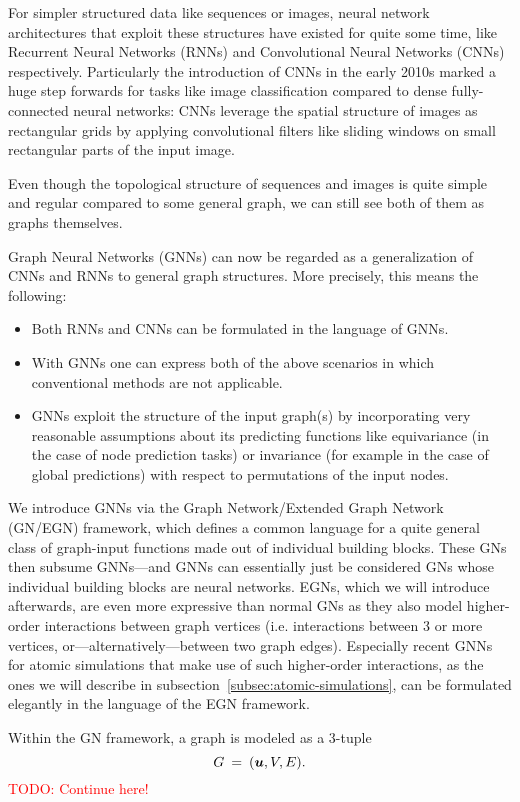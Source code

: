 For simpler structured data like sequences or images, neural
network architectures that exploit these structures have existed for quite some time, like 
Recurrent Neural Networks (RNNs) and
Convolutional Neural Networks (CNNs) respectively. Particularly the introduction of CNNs 
in the early 2010s marked a huge step forwards for tasks like image classification 
compared to dense fully-connected neural networks: CNNs leverage the spatial structure of
images as rectangular grids by applying convolutional filters like sliding windows on small
rectangular parts of the input image. 

Even though the topological structure of sequences and images is quite simple and regular
compared to some general graph, we can still see both of them as graphs themselves. 



Graph Neural 
Networks (GNNs) can now be regarded as a generalization of CNNs and RNNs to general graph structures.
More precisely, this means the following:

\begin{itemize}
    \item Both RNNs and CNNs can be formulated in the language of GNNs.
    \item With GNNs one can express both of the above scenarios in which conventional
          methods are not applicable.
    \item GNNs exploit the structure of the input graph(s) by incorporating very
          reasonable assumptions about its predicting functions like equivariance
          (in the case of node prediction tasks) or invariance (for example in 
          the case of global predictions) with respect to permutations of the input
          nodes.
\end{itemize}

We introduce GNNs via the Graph Network/Extended Graph Network (GN/EGN) framework, which defines
a common language for a quite general class of graph-input functions made out of 
individual building blocks. These GNs then subsume GNNs---and GNNs can essentially just be 
considered GNs whose individual building blocks are neural networks. 
EGNs, which we will introduce afterwards, are even more expressive than normal 
GNs as they also model higher-order interactions between graph vertices (i.e. interactions 
between 3 or more vertices, or---alternatively---between two graph edges). Especially
recent GNNs for atomic simulations that make use of such higher-order interactions, as the ones 
we will describe in subsection~\ref{subsec:atomic-simulations}, can be formulated elegantly in the
language of the EGN framework.

Within the GN framework, a graph is modeled as a 3-tuple
\[ G \: = \: (\boldsymbol{u}, V, E) \text{.} \]
\textcolor{red}{TODO: Continue here!}